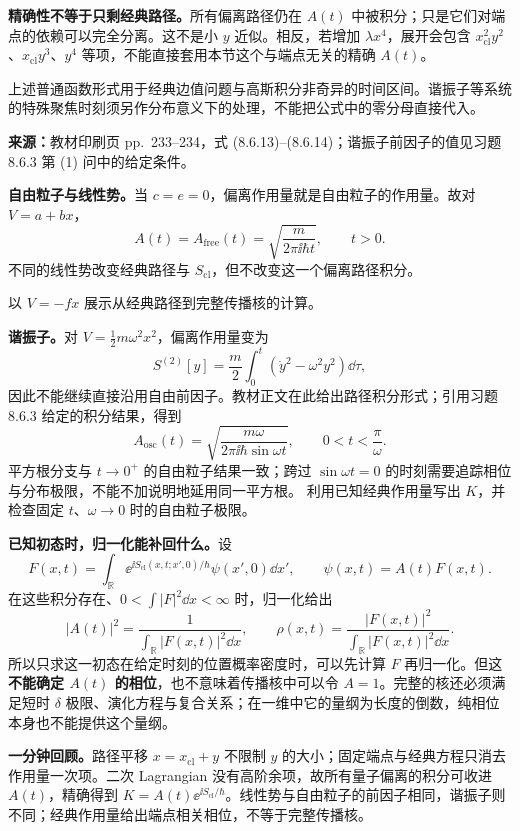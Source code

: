 \textbf{精确性不等于只剩经典路径。}所有偏离路径仍在 $A(t)$ 中被积分；只是它们对端点的依赖可以完全分离。这不是小 $y$ 近似。相反，若增加 $\lambda x^4$，展开会包含 $x_{\mathrm{cl}}^2y^2$、$x_{\mathrm{cl}}y^3$、$y^4$ 等项，不能直接套用本节这个与端点无关的精确 $A(t)$。

上述普通函数形式用于经典边值问题与高斯积分非奇异的时间区间。谐振子等系统的特殊聚焦时刻须另作分布意义下的处理，不能把公式中的零分母直接代入。

\textbf{来源：}教材印刷页 pp.~233--234，式 (8.6.13)--(8.6.14)；谐振子前因子的值见习题 8.6.3 第 (1) 问中的给定条件。

\textbf{自由粒子与线性势。}当 $c=e=0$，偏离作用量就是自由粒子的作用量。故对 $V=a+bx$，
\begin{equation}
  \boxed{A(t)=A_{\mathrm{free}}(t)
    =\sqrt{\frac{m}{2\pi\ii\hbar t}}},\qquad t>0.
\end{equation}
不同的线性势改变经典路径与 $S_{\mathrm{cl}}$，但不改变这一个偏离路径积分。

 以 $V=-fx$ 展示从经典路径到完整传播核的计算。

\textbf{谐振子。}对 $V=\frac12m\omega^2x^2$，偏离作用量变为
\begin{equation}
  S^{(2)}[y]=\frac m2\int_0^t(\dot y^2-\omega^2y^2)\dd\tau,
\end{equation}
因此不能继续直接沿用自由前因子。教材正文在此给出路径积分形式；引用习题 8.6.3 给定的积分结果，得到
\begin{equation}
  \boxed{A_{\mathrm{osc}}(t)
    =\sqrt{\frac{m\omega}{2\pi\ii\hbar\sin\omega t}}},
  \qquad 0<t<\frac\pi\omega.
\end{equation}
平方根分支与 $t\to0^+$ 的自由粒子结果一致；跨过 $\sin\omega t=0$ 的时刻需要追踪相位与分布极限，不能不加说明地延用同一平方根。 利用已知经典作用量写出 $K$，并检查固定 $t$、$\omega\to0$ 时的自由粒子极限。

\textbf{已知初态时，归一化能补回什么。}设
\begin{equation}
  F(x,t)=\int_{\mathbb R}
    \ee^{\ii S_{\mathrm{cl}}(x,t;x',0)/\hbar}\psi(x',0)\dd x',
  \qquad \psi(x,t)=A(t)F(x,t).
\end{equation}
在这些积分存在、$0<\int|F|^2\dd x<\infty$ 时，归一化给出
\begin{equation}
  |A(t)|^2=\frac1{\int_{\mathbb R}|F(x,t)|^2\dd x},\qquad
  \rho(x,t)=\frac{|F(x,t)|^2}{\int_{\mathbb R}|F(x,t)|^2\dd x}.
\end{equation}
所以只求这一初态在给定时刻的位置概率密度时，可以先计算 $F$ 再归一化。但这\textbf{不能确定 $A(t)$ 的相位}，也不意味着传播核中可以令 $A=1$。完整的核还必须满足短时 $\delta$ 极限、演化方程与复合关系；在一维中它的量纲为长度的倒数，纯相位本身也不能提供这个量纲。

\textbf{一分钟回顾。}路径平移 $x=x_{\mathrm{cl}}+y$ 不限制 $y$ 的大小；固定端点与经典方程只消去作用量一次项。二次 Lagrangian 没有高阶余项，故所有量子偏离的积分可收进 $A(t)$，精确得到 $K=A(t)\ee^{\ii S_{\mathrm{cl}}/\hbar}$。线性势与自由粒子的前因子相同，谐振子则不同；经典作用量给出端点相关相位，不等于完整传播核。
